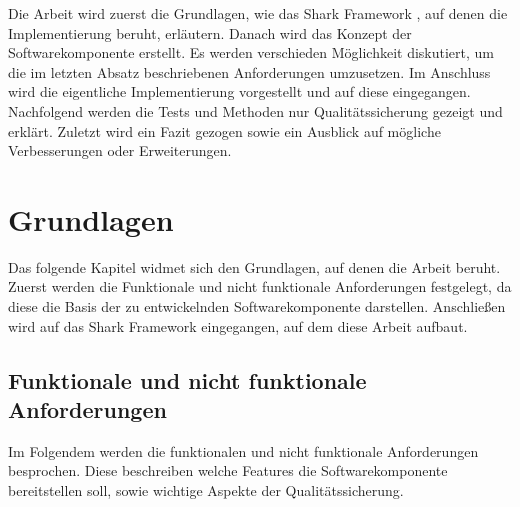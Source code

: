 \documentclass[a4paper]{article}
\begin{document}
	Die Arbeit wird zuerst die Grundlagen, wie das Shark Framework \cite{SharkFW},
	auf denen die Implementierung beruht, erläutern. Danach wird das Konzept
	der Softwarekomponente erstellt. Es werden verschieden Möglichkeit
	diskutiert, um die im letzten Absatz beschriebenen Anforderungen umzusetzen.
	Im Anschluss wird die eigentliche Implementierung vorgestellt und auf
	diese eingegangen. Nachfolgend werden die Tests und Methoden nur
	Qualitätssicherung gezeigt und erklärt. Zuletzt wird ein Fazit gezogen
	sowie ein Ausblick auf mögliche Verbesserungen oder Erweiterungen.

	\newpage
	
	\section{Grundlagen}
	
	Das folgende Kapitel widmet sich den Grundlagen, auf denen die Arbeit
	beruht. Zuerst werden die Funktionale und nicht funktionale Anforderungen
	festgelegt, da diese die Basis der zu entwickelnden Softwarekomponente
	darstellen. Anschließen wird auf das Shark Framework eingegangen, auf dem
	diese Arbeit aufbaut.	
	
	\subsection{Funktionale und nicht funktionale Anforderungen}
	\label{sec:requirements}
	
	Im Folgendem werden die funktionalen und nicht funktionale
	Anforderungen besprochen. Diese	beschreiben welche Features die
	Softwarekomponente bereitstellen soll, sowie wichtige Aspekte der
	Qualitätssicherung.
	
\end{document}
